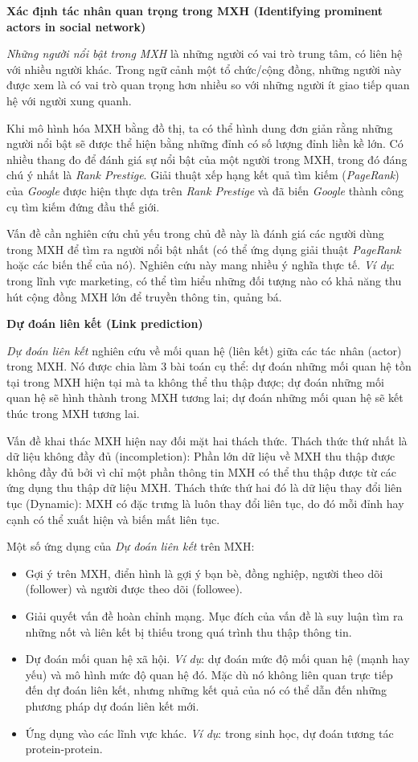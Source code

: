 \documentclass[12pt]{extarticle}
\begin{document}
			\par \textbf{Xác định tác nhân quan trọng trong MXH (Identifying prominent actors in social network)}
			\par \textit{Những người nổi bật trong MXH} là những người có vai trò trung tâm, có liên hệ với nhiều người khác. Trong ngữ cảnh một tổ chức/cộng đồng, những người này được xem là có vai trò quan trọng hơn nhiều so với những người ít giao tiếp quan hệ với người xung quanh.
			\par Khi mô hình hóa MXH bằng đồ thị, ta có thể hình dung đơn giản rằng những người nổi bật sẽ được thể hiện bằng những đỉnh có số lượng đỉnh liền kề lớn. Có nhiều thang đo để đánh giá sự nổi bật của một người trong MXH, trong đó đáng chú ý nhất là \textit{Rank Prestige}. Giải thuật xếp hạng kết quả tìm kiếm (\textit{PageRank}) của \textit{Google} được hiện thực dựa trên \textit{Rank Prestige} và đã biến \textit{Google} thành công cụ tìm kiếm đứng đầu thế giới.
			\par Vấn đề cần nghiên cứu chủ yếu trong chủ đề này là đánh giá các người dùng trong MXH để tìm ra người nổi bật nhất (có thể ứng dụng giải thuật \textit{PageRank} hoặc các biến thể của nó). Nghiên cứu này mang nhiều ý nghĩa thực tế. \textit{Ví dụ}: trong lĩnh vực marketing, có thể tìm hiểu những đối tượng nào có khả năng thu hút cộng đồng MXH lớn để truyền thông tin, quảng bá.
			\par \textbf{Dự đoán liên kết (Link prediction)}
			\par \textit{Dự đoán liên kết} nghiên cứu về mối quan hệ (liên kết) giữa các tác nhân (actor) trong MXH. Nó được chia làm 3 bài toán cụ thể: dự đoán những mối quan hệ tồn tại trong MXH hiện tại mà ta không thể thu thập được; dự đoán những mối quan hệ sẽ hình thành trong MXH tương lai; dự đoán những mối quan hệ sẽ kết thúc trong MXH tương lai.
			\par Vấn đề khai thác MXH hiện nay đối mặt hai thách thức. Thách thức thứ nhất là dữ liệu không đầy đủ (incompletion): Phần lớn dữ liệu về MXH thu thập được không đầy đủ bởi vì chỉ một phần thông tin MXH có thể thu thập được từ các ứng dụng thu thập dữ liệu MXH. Thách thức thứ hai đó là dữ liệu thay đổi liên tục (Dynamic): MXH có đặc trưng là luôn thay đổi liên tục, do đó mỗi đỉnh hay cạnh có thể xuất hiện và biến mất liên tục.
			\par Một số ứng dụng của \textit{Dự đoán liên kết} trên MXH:
			\begin{itemize}
				\item Gợi ý trên MXH, điển hình là gợi ý bạn bè, đồng nghiệp, người theo dõi (follower) và người được theo dõi (followee).
				\item Giải quyết vấn đề hoàn chỉnh mạng. Mục đích của vấn đề là suy luận tìm ra những nốt và liên kết bị thiếu trong quá trình thu thập thông tin.
				\item Dự đoán mối quan hệ xã hội. \textit{Ví dụ}: dự đoán mức độ mối quan hệ (mạnh hay yếu) và mô hình mức độ quan hệ đó. Mặc dù nó không liên quan trực tiếp đến dự đoán liên kết, nhưng những kết quả của nó có thể dẫn đến những phương pháp dự đoán liên kết mới.
				\item Ứng dụng vào các lĩnh vực khác. \textit{Ví dụ}: trong sinh học, dự đoán tương tác protein-protein. 
			\end{itemize}
\end{document}
